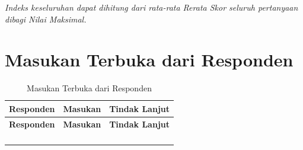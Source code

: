 \textit{Indeks keseluruhan dapat dihitung dari rata-rata Rerata Skor seluruh pertanyaan dibagi Nilai Maksimal.}

\section{Masukan Terbuka dari Responden}

\begin{longtable}{|L{0.20}|L{0.42}|L{0.38}|}
\caption{Masukan Terbuka dari Responden}\\
\hline
{}\textbf{Responden} & \textbf{Masukan} & \textbf{Tindak Lanjut} \\ \hline
\endfirsthead
\hline
{}\textbf{Responden} & \textbf{Masukan} & \textbf{Tindak Lanjut} \\ \hline
\endhead
 & & \\ \hline
 & & \\ \hline
 & & \\ \hline
 & & \\ \hline
\end{longtable}
